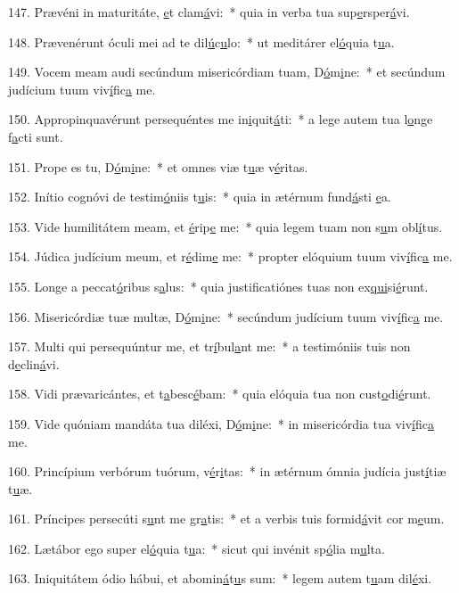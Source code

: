 147. Prævéni in maturitáte, \uline{e}t clam\uline{á}vi:~* quia in verba tua sup\uline{e}rsper\uline{á}vi.\par 
148. Prævenérunt óculi mei ad te dil\uline{ú}c\uline{u}lo:~* ut meditárer el\uline{ó}quia t\uline{u}a.\par 
149. Vocem meam audi secúndum misericórdiam tuam, D\uline{ó}m\uline{i}ne:~* et secúndum judícium tuum viv\uline{í}fic\uline{a} me.\par 
150. Appropinquavérunt persequéntes me in\uline{i}quit\uline{á}ti:~* a lege autem tua l\uline{o}nge f\uline{a}cti sunt.\par 
151. Prope es tu, D\uline{ó}m\uline{i}ne:~* et omnes viæ t\uline{u}æ v\uline{é}ritas.\par 
152. Inítio cognóvi de testim\uline{ó}niis t\uline{u}is:~* quia in ætérnum fund\uline{á}sti \uline{e}a.\par 
153. Vide humilitátem meam, et \uline{é}rip\uline{e} me:~* quia legem tuam non s\uline{u}m obl\uline{í}tus.\par 
154. Júdica judícium meum, et r\uline{é}dim\uline{e} me:~* propter elóquium tuum viv\uline{í}fic\uline{a} me.\par 
155. Longe a peccat\uline{ó}ribus s\uline{a}lus:~* quia justificatiónes tuas non ex\uline{qui}si\uline{é}runt.\par 
156. Misericórdiæ tuæ multæ, D\uline{ó}m\uline{i}ne:~* secúndum judícium tuum viv\uline{í}fic\uline{a} me.\par 
157. Multi qui persequúntur me, et tr\uline{í}bul\uline{a}nt me:~* a testimóniis tuis non d\uline{e}clin\uline{á}vi.\par 
158. Vidi prævaricántes, et t\uline{a}besc\uline{é}bam:~* quia elóquia tua non cust\uline{o}di\uline{é}runt.\par 
159. Vide quóniam mandáta tua diléxi, D\uline{ó}m\uline{i}ne:~* in misericórdia tua viv\uline{í}fic\uline{a} me.\par 
160. Princípium verbórum tuórum, v\uline{é}r\uline{i}tas:~* in ætérnum ómnia judícia just\uline{í}tiæ t\uline{u}æ.\par 
161. Príncipes persecúti s\uline{u}nt me gr\uline{a}tis:~* et a verbis tuis formid\uline{á}vit cor m\uline{e}um.\par 
162. Lætábor ego super el\uline{ó}quia t\uline{u}a:~* sicut qui invénit sp\uline{ó}lia m\uline{u}lta.\par 
163. Iniquitátem ódio hábui, et abomin\uline{á}t\uline{u}s sum:~* legem autem t\uline{u}am dil\uline{é}xi.\par 
